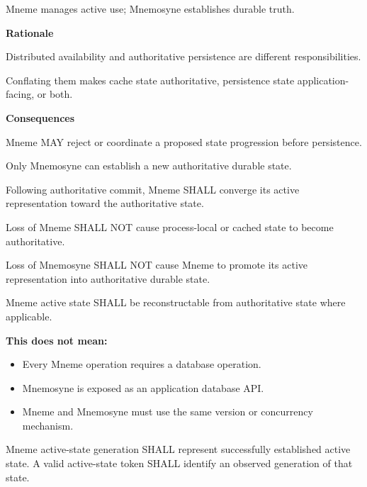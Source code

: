 Mneme manages active use; Mnemosyne establishes durable truth.



\par\medskip\textbf{Rationale}\par


Distributed availability and authoritative persistence are different
responsibilities.



Conflating them makes cache state authoritative, persistence state
application-facing, or both.



\par\medskip\textbf{Consequences}\par


Mneme MAY reject or coordinate a proposed state progression before
persistence.



Only Mnemosyne can establish a new authoritative durable state.



Following authoritative commit, Mneme SHALL converge its active
representation toward the authoritative state.



Loss of Mneme SHALL NOT cause process-local or cached state to become
authoritative.



Loss of Mnemosyne SHALL NOT cause Mneme to promote its active
representation into authoritative durable state.



Mneme active state SHALL be reconstructable from authoritative state
where applicable.



\textbf{This does not mean:}



\begin{itemize}


\item Every Mneme operation requires a database operation.

\item Mnemosyne is exposed as an application database API.

\item Mneme and Mnemosyne must use the same version or concurrency mechanism.

\end{itemize}


Mneme active-state generation SHALL represent successfully established active state. A valid active-state token SHALL identify an observed generation of that state.




